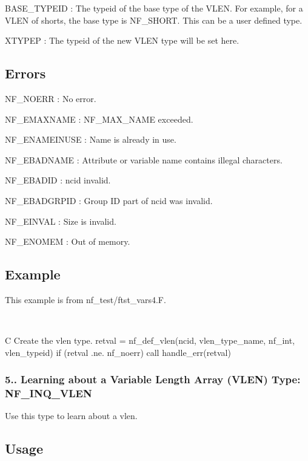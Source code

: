 {\ttfamily B\+A\+S\+E\+\_\+\+T\+Y\+P\+E\+ID} \+: The typeid of the base type of the V\+L\+EN. For example, for a V\+L\+EN of shorts, the base type is N\+F\+\_\+\+S\+H\+O\+RT. This can be a user defined type.

{\ttfamily X\+T\+Y\+P\+EP} \+: The typeid of the new V\+L\+EN type will be set here.

\subsection*{Errors }

{\ttfamily N\+F\+\_\+\+N\+O\+E\+RR} \+: No error.

{\ttfamily N\+F\+\_\+\+E\+M\+A\+X\+N\+A\+ME} \+: N\+F\+\_\+\+M\+A\+X\+\_\+\+N\+A\+ME exceeded.

{\ttfamily N\+F\+\_\+\+E\+N\+A\+M\+E\+I\+N\+U\+SE} \+: Name is already in use.

{\ttfamily N\+F\+\_\+\+E\+B\+A\+D\+N\+A\+ME} \+: Attribute or variable name contains illegal characters.

{\ttfamily N\+F\+\_\+\+E\+B\+A\+D\+ID} \+: ncid invalid.

{\ttfamily N\+F\+\_\+\+E\+B\+A\+D\+G\+R\+P\+ID} \+: Group ID part of ncid was invalid.

{\ttfamily N\+F\+\_\+\+E\+I\+N\+V\+AL} \+: Size is invalid.

{\ttfamily N\+F\+\_\+\+E\+N\+O\+M\+EM} \+: Out of memory.

\subsection*{Example }

This example is from nf\+\_\+test/ftst\+\_\+vars4.\+F.

 

C Create the vlen type. retval = nf\+\_\+def\+\_\+vlen(ncid, vlen\+\_\+type\+\_\+name, nf\+\_\+int, vlen\+\_\+typeid) if (retval .ne. nf\+\_\+noerr) call handle\+\_\+err(retval)

\subsubsection*{5.. Learning about a Variable Length Array (V\+L\+EN) Type\+: N\+F\+\_\+\+I\+N\+Q\+\_\+\+V\+L\+EN}

Use this type to learn about a vlen.

\subsection*{Usage }

